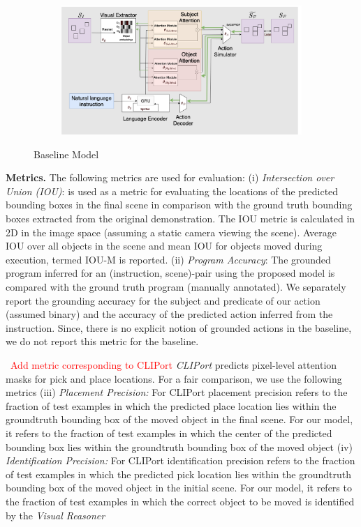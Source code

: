 \begin{figure}
\begin{subfigure}{1.0\hsize}
     \centering    
     \includegraphics[scale=0.19]{figures/baseline.png}
    \label{fig:large_scenes}
\end{subfigure}%
\caption{Baseline Model}
\end{figure}

\textbf{Metrics.}
%
The following metrics are used for evaluation: 
(i) \emph{Intersection over Union (IOU)}: is used as a metric for evaluating the locations of the predicted bounding boxes in the final scene in comparison with the ground truth bounding boxes extracted from the original demonstration. The IOU metric is calculated in 2D in the image space (assuming a static camera viewing the scene). Average IOU over all objects in the scene and mean IOU for objects moved during execution, termed IOU-M is reported.  
(ii) \emph{Program Accuracy}: The grounded program inferred for an (instruction, scene)-pair using the proposed model is compared with the ground truth program (manually annotated). We separately report the grounding accuracy for the subject and predicate of our action (assumed binary) and the accuracy of the predicted action inferred from the instruction. Since, there is no explicit notion of grounded actions in the baseline, we do not report this metric for the baseline. 

~\textcolor{red}{Add metric corresponding to CLIPort}
\emph{CLIPort} predicts pixel-level attention masks for pick and place locations. For a fair comparison, we use the following metrics 
(iii) \emph{Placement Precision:} For CLIPort placement precision refers to the fraction of test examples in which the predicted place location lies within the groundtruth bounding box of the moved object in the final scene. For our model, it refers to the fraction of test examples in which the center of the predicted bounding box lies within the groundtruth bounding box of the moved object
(iv) \emph{Identification Precision:} For CLIPort identification precision refers to the fraction of test examples in which the predicted pick location lies within the groundtruth bounding box of the moved object in the initial scene. For our model, it refers to the fraction of test examples in which the correct object to be moved is identified by the \emph{Visual Reasoner}

